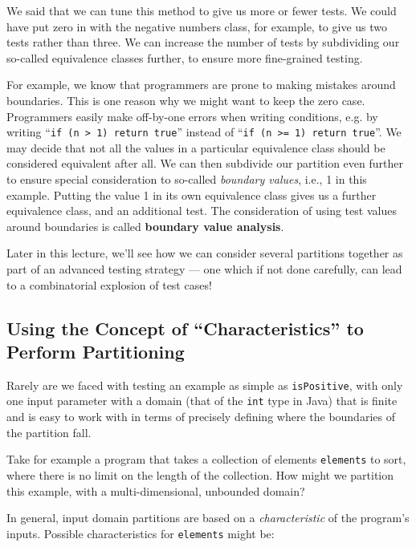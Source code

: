 We said that we can tune this method to give us more or fewer tests. We could
have put zero in with the negative numbers class, for example, to give us two
tests rather than three. We can increase the number of tests by subdividing our
so-called equivalence classes further, to ensure more fine-grained testing.


For example, we know that programmers are prone to making mistakes around
boundaries. This is one reason why we might want to keep the zero case.
Programmers easily make off-by-one errors when writing conditions, e.g. by
writing ``{\tt if (n > 1) return true}'' instead of ``{\tt if (n >= 1) return
true}''. We may decide that not all the values in a particular equivalence class
should be considered equivalent after all. We can then subdivide our partition
even further to ensure special consideration to so-called {\it boundary values},
i.e., 1 in this example. Putting the value 1 in its own equivalence class gives
us a further equivalence class, and an additional test.
%
The consideration of using test values around boundaries is called {\bf boundary
value analysis}.

Later in this lecture, we'll see how we can consider several partitions together
as part of an advanced testing strategy --- one which if not done carefully, can
lead to a combinatorial explosion of test cases! 


\subsection{Using the Concept of ``Characteristics'' to Perform Partitioning}

Rarely are we faced with testing an example as simple as {\tt isPositive}, with
only one input parameter with a domain (that of the {\tt int} type in Java) that
is finite and is easy to work with in terms of precisely defining where the
boundaries of the partition fall.

Take for example a program that takes a collection of elements {\tt elements} to sort,
where there is no limit on the length of the collection. How might we partition
this example, with a multi-dimensional, unbounded domain?

In general, input domain partitions are based on a {\it characteristic} of the
program's inputs. Possible characteristics for {\tt elements} might be:

